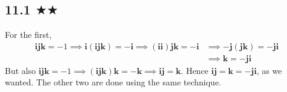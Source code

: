 

\subsection{11.1 $\bigstar\bigstar$}
For the first, 
\begin{align*}\mathbf{i}\mathbf{j}\mathbf{k}=-1\implies\mathbf{i}(\mathbf{i}\mathbf{j}\mathbf{k})=-\mathbf{i}\implies(\mathbf{i}\mathbf{i})\mathbf{j}\mathbf{k}=-\mathbf{i}&\implies-\mathbf{j}(\mathbf{j}\mathbf{k})=-\mathbf{j}\mathbf{i}\\
&\implies \mathbf{k}=-\mathbf{j}\mathbf{i}
\end{align*}
But also $\mathbf{i}\mathbf{j}\mathbf{k}=-1\implies(\mathbf{i}\mathbf{j}\mathbf{k})\mathbf{k}=-\mathbf{k}\implies\mathbf{i}\mathbf{j}=\mathbf{k}$. Hence $\mathbf{i}\mathbf{j}=\mathbf{k}=-\mathbf{j}\mathbf{i}$, as we wanted. The other two are done using the same technique.




